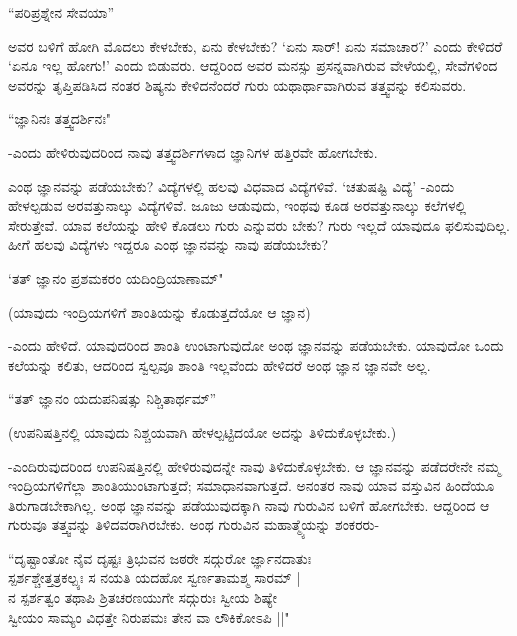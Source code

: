\begin{shloka}
``ಪರಿಪ್ರಶ್ನೇನ ಸೇವಯಾ''
\end{shloka}

ಅವರ ಬಳಿಗೆ ಹೋಗಿ ಮೊದಲು ಕೇಳಬೇಕು, ಏನು ಕೇಳಬೇಕು? `ಏನು ಸಾರ್! ಏನು ಸಮಾಚಾರ?' ಎಂದು ಕೇಳಿದರೆ `ಏನೂ ಇಲ್ಲ ಹೋಗು!' ಎಂದು ಬಿಡುವರು. ಆದ್ದರಿಂದ ಅವರ ಮನಸ್ಸು ಪ್ರಸನ್ನವಾಗಿರುವ ವೇಳೆಯಲ್ಲಿ, ಸೇವೆಗಳಿಂದ ಅವರನ್ನು ತೃಪ್ತಿಪಡಿಸಿದ ನಂತರ ಶಿಷ್ಯನು ಕೇಳಿದನೆಂದರೆ ಗುರು ಯಥಾರ್ಥಾವಾಗಿರುವ ತತ್ತ್ವವನ್ನು ಕಲಿಸುವರು. 

\begin{shloka}
``ಜ್ಞಾನಿನಃ ತತ್ತ್ವದರ್ಶಿನಃ"
\end{shloka}

-ಎಂದು ಹೇಳಿರುವುದರಿಂದ ನಾವು ತತ್ತ್ವದರ್ಶಿಗಳಾದ ಜ್ಞಾನಿಗಳ ಹತ್ತಿರವೇ ಹೋಗಬೇಕು.

ಎಂಥ ಜ್ಞಾನವನ್ನು ಪಡೆಯಬೇಕು? ವಿದ್ಯೆಗಳಲ್ಲಿ ಹಲವು ವಿಧವಾದ ವಿದ್ಯೆಗಳಿವೆ. `ಚತುಷಷ್ಟಿ ವಿದ್ಯೆ' -ಎಂದು ಹೇಳಲ್ಪಡುವ ಅರವತ್ತುನಾಲ್ಕು ವಿದ್ಯೆಗಳಿವೆ. ಜೂಜು ಆಡುವುದು, ಇಂಥವು ಕೂಡ ಅರವತ್ತುನಾಲ್ಕು ಕಲೆಗಳಲ್ಲಿ ಸೇರುತ್ತೇವೆ. ಯಾವ ಕಲೆಯನ್ನು ಹೇಳಿ ಕೊಡಲು ಗುರು ಎನ್ನುವರು ಬೇಕು? ಗುರು ಇಲ್ಲದೆ ಯಾವುದೂ ಫಲಿಸುವುದಿಲ್ಲ. ಹೀಗೆ ಹಲವು ವಿದ್ಯೆಗಳು ಇದ್ದರೂ ಎಂಥ ಜ್ಞಾನವನ್ನು ನಾವು ಪಡೆಯಬೇಕು? 

\begin{shloka}
`ತತ್ ಜ್ಞಾನಂ ಪ್ರಶಮಕರಂ ಯದಿಂದ್ರಿಯಾಣಾಮ್" 
\end{shloka}

(ಯಾವುದು ಇಂದ್ರಿಯಗಳಿಗೆ ಶಾಂತಿಯನ್ನು ಕೊಡುತ್ತದೆಯೋ ಆ ಜ್ಞಾನ)

-ಎಂದು ಹೇಳಿದೆ. ಯಾವುದರಿಂದ ಶಾಂತಿ ಉಂಟಾಗುವುದೋ ಅಂಥ ಜ್ಞಾನವನ್ನು ಪಡೆಯಬೇಕು. ಯಾವುದೋ ಒಂದು ಕಲೆಯನ್ನು ಕಲಿತು, ಆದರಿಂದ ಸ್ವಲ್ಪವೂ ಶಾಂತಿ ಇಲ್ಲವೆಂದು ಹೇಳಿದರೆ ಅಂಥ ಜ್ಞಾನ ಜ್ಞಾನವೇ ಅಲ್ಲ. 

\begin{shloka}
``ತತ್ ಜ್ಞಾನಂ ಯದುಪನಿಷತ್ಸು ನಿಶ್ಚಿತಾರ್ಥಮ್''
\end{shloka}

(ಉಪನಿಷತ್ತಿನಲ್ಲಿ ಯಾವುದು ನಿಶ್ಚಯವಾಗಿ ಹೇಳಲ್ಪಟ್ಟಿದಯೋ ಅದನ್ನು ತಿಳಿದುಕೊಳ್ಳಬೇಕು.)

-ಎಂದಿರುವುದರಿಂದ ಉಪನಿಷತ್ತಿನಲ್ಲಿ ಹೇಳಿರುವುದನ್ನೇ ನಾವು ತಿಳಿದುಕೊಳ್ಳಬೇಕು. ಆ ಜ್ಞಾನವನ್ನು ಪಡೆದರೇನೇ ನಮ್ಮ ಇಂದ್ರಿಯಗಳಿಗೆಲ್ಲಾ ಶಾಂತಿಯುಂಟಾಗುತ್ತದೆ; ಸಮಾಧಾನವಾಗುತ್ತದೆ. ಅನಂತರ ನಾವು ಯಾವ ವಸ್ತುವಿನ ಹಿಂದೆಯೂ ತಿರುಗಾಡಬೇಕಾಗಿಲ್ಲ. ಅಂಥ ಜ್ಞಾನವನ್ನು ಪಡೆಯುವುದಕ್ಕಾಗಿ ನಾವು ಗುರುವಿನ ಬಳಿಗೆ ಹೋಗಬೇಕು. ಆದ್ದರಿಂದ ಆ ಗುರುವೂ ತತ್ತ್ವವನ್ನು ತಿಳಿದವರಾಗಿರಬೇಕು. ಅಂಥ ಗುರುವಿನ ಮಹಾತ್ಮ್ಯೆಯನ್ನು ಶಂಕರರು-

\begin{shloka}
``ದೃಷ್ಟಾಂತೋ ನೈವ ದೃಷ್ಟಃ ತ್ರಿಭುವನ ಜಠರೇ ಸದ್ಗುರೋ ರ್ಜ್ಞಾನದಾತುಃ\\
ಸ್ಪರ್ಶಶ್ಚೇತ್ತತ್ರಕಲ್ಪ್ಯಃ ಸ ನಯತಿ ಯದಹೋ ಸ್ವರ್ಣತಾಮಶ್ಮ ಸಾರಮ್ |\\
ನ ಸ್ಪರ್ಶತ್ವಂ ತಥಾಪಿ ಶ್ರಿತಚರಣಯುಗೇ ಸದ್ಗುರುಃ ಸ್ವೀಯ ಶಿಷ್ಯೇ\\
ಸ್ವೀಯಂ ಸಾಮ್ಯಂ ವಿಧತ್ತೇ ನಿರುಪಮಃ ತೇನ ವಾ ಲೌಕಿಕೋಽಪಿ ||" 
\end{shloka}


